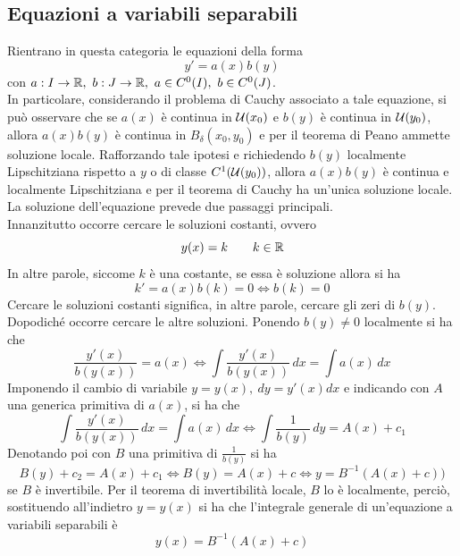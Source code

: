 \subsection{Equazioni a variabili separabili}
Rientrano in questa categoria le equazioni della forma
\begin{equation} \label{Eq: Equazione a variabili separabili}
    y'=a(x)b(y) 
\end{equation}
con $a:I \to \mathbb{R},\ b: J \to \mathbb{R},\ a \in C^0(I),\ b \in C^0(J)$.\\
In particolare, considerando il problema di Cauchy associato a tale equazione, si può osservare che se $a(x)$ è continua in $\mathcal{U}(x_0)$ e $b(y)$ è continua in $\mathcal{U}(y_0)$, allora $a(x)b(y)$ è continua in $B_\delta(x_0, y_0)$ e per il teorema di Peano ammette soluzione locale. Rafforzando tale ipotesi e richiedendo $b(y)$ localmente Lipschitziana rispetto a $y$ o di classe $C^1(\mathcal{U}(y_0))$, allora $a(x)b(y)$ è continua e localmente Lipschitziana e per il teorema di Cauchy ha un'unica soluzione locale.\\
La soluzione dell'equazione prevede due passaggi principali.\\
Innanzitutto occorre cercare le soluzioni costanti, ovvero
\begin{equation*}
    y(x)=k \qquad k \in \mathbb{R}
\end{equation*}
In altre parole, siccome $k$ è una costante, se essa è soluzione allora si ha 
\begin{equation*}
    k' = a(x)b(k) = 0 \iff b(k)=0
\end{equation*}
Cercare le soluzioni costanti significa, in altre parole, cercare gli zeri di $b(y)$.\\
Dopodiché occorre cercare le altre soluzioni. Ponendo $b(y) \neq 0$ localmente si ha che
\begin{equation*}
    \frac{y'(x)}{b(y(x))}=a(x) \iff \int{\frac{y'(x)}{b(y(x))}}\, dx=\int{a(x)}\, dx 
\end{equation*}
Imponendo il cambio di variabile $y=y(x),\ dy=y'(x)dx$ e indicando con $A$ una generica primitiva di $a(x)$, si ha che
\begin{equation*}
    \int{\frac{y'(x)}{b(y(x))}}\, dx=\int{a(x)}\, dx \iff \int{\frac{1}{b(y)}}\,dy=A(x)+c_1
\end{equation*}
Denotando poi con $B$ una primitiva di $\tfrac{1}{b(y)}$ si ha
\begin{equation*}
    B(y)+c_2=A(x)+c_1 \iff B(y)=A(x)+c \iff y=B^{-1}(A(x)+c))
\end{equation*}
se $B$ è invertibile. Per il teorema di invertibilità locale, $B$ lo è localmente, perciò, sostituendo all'indietro $y=y(x)$ si ha che l'integrale generale di un'equazione a variabili separabili è
\begin{equation*} 
    y(x)=B^{-1}(A(x)+c)
\end{equation*}
